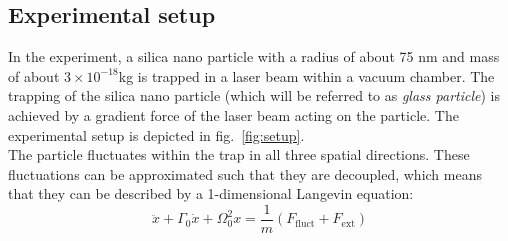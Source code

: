 \documentclass[12pt]{article}
\begin{document}
\subsection{Experimental setup}
In the experiment, a silica nano particle with a radius of about 75 nm and mass of about $3 \times 10^{-18}$kg is trapped in a laser beam within a
vacuum chamber. The trapping of the silica nano particle (which will be referred to as \textit{glass particle}) is achieved by a gradient force of the
laser beam acting on the particle. The experimental setup is depicted in fig.~\ref{fig:setup}.\\
The particle fluctuates within the trap in all three spatial directions. These fluctuations can be approximated
such that they are decoupled, which means that they can be described by a 1-dimensional Langevin equation:
\begin{equation}
    \ddot{x} + \Gamma_0 \dot{x} + \Omega^2_0x = \frac 1 m \left(F_\text{fluct} + F_\text{ext}\right)
\end{equation}
\end{document}
